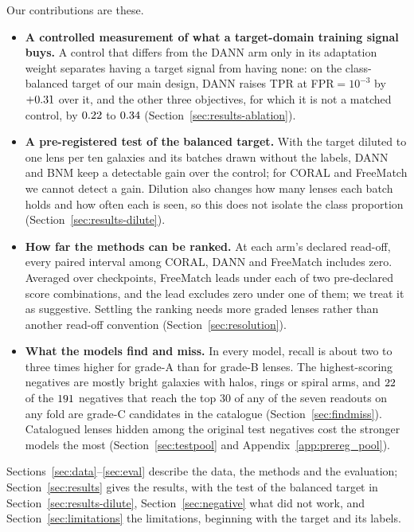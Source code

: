 Our contributions are these.
\begin{itemize}
\item \textbf{A controlled measurement of what a target-domain training signal buys.} A
      control that differs from the DANN arm only in its adaptation weight separates having
      a target signal from having none: on the class-balanced target of our main design, DANN
      raises TPR at FPR${}=10^{-3}$ by $+0.31{}$ over it, and the other three objectives,
      for which it is not a matched control, by $0.22{}$ to $0.34{}$ (Section~\ref{sec:results-ablation}).
\item \textbf{A pre-registered test of the balanced target.} With the target diluted to one lens
      per ten galaxies and its batches drawn without the labels, DANN and BNM keep a detectable
      gain over the control; for CORAL and FreeMatch we cannot detect a gain.
      Dilution also changes how many lenses each batch holds and how often each is seen, so
      this does not isolate the class proportion (Section~\ref{sec:results-dilute}).
\item \textbf{How far the methods can be ranked.} At each arm's declared read-off, every paired
      interval among CORAL, DANN and FreeMatch includes zero. Averaged over \rwFiveKWord{}
      checkpoints, FreeMatch leads under each of two pre-declared score combinations, and the
      lead excludes zero under one of them; we treat it as suggestive. Settling the ranking
      needs more graded lenses rather than another read-off convention
      (Section~\ref{sec:resolution}).
\item \textbf{What the models find and miss.} In every model, recall is about two to three
      times higher for grade-A than for grade-B lenses. The highest-scoring negatives are mostly
      bright galaxies with halos, rings or spiral arms, and $22{}$ of the
      $191{}$ negatives that reach the top 30 of any of the seven readouts on any fold are grade-C
      candidates in the catalogue (Section~\ref{sec:findmiss}). Catalogued lenses hidden among
      the original test negatives cost the stronger models the most
      (Section~\ref{sec:testpool} and Appendix~\ref{app:prereg_pool}).
\end{itemize}

Sections~\ref{sec:data}--\ref{sec:eval} describe the data, the methods and the evaluation;
Section~\ref{sec:results} gives the results, with the test of the balanced target in
Section~\ref{sec:results-dilute}, Section~\ref{sec:negative} what did not work,
and Section~\ref{sec:limitations} the limitations, beginning with the target and its labels.
